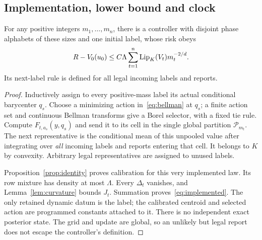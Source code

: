 \subsection{Implementation, lower bound and clock}
\begin{lemma}\label{lem:implementation}
For any positive integers $m_1,\ldots,m_n$, there is a controller with disjoint phase alphabets of these sizes and one initial label, whose risk obeys
\begin{equation}\label{eq:implemented}
 R-V_0(u_0)\le C\Lambda\sum_{t=1}^n\operatorname{Lip}_K(V_t)m_t^{-2/d}.
\end{equation}
Its next-label rule is defined for all legal incoming labels and reports.
\end{lemma}
\begin{proof}
Inductively assign to every positive-mass label its actual conditional barycenter $q_s$. Choose a minimizing action in~\eqref{eq:bellman} at $q_s$; a finite action set and continuous Bellman transforms give a Borel selector, with a fixed tie rule. Compute $F_{t,a_s}(y,q_s)$ and send it to its cell in the single global partition $\mathcal P_{m_t}$. The next representative is the conditional mean of this unpooled value after integrating over \emph{all} incoming labels and reports entering that cell. It belongs to $K$ by convexity. Arbitrary legal representatives are assigned to unused labels.

Proposition~\ref{prop:identity} proves calibration for this very implemented law. Its row mixture has density at most $\Lambda$. Every $\Delta_t$ vanishes, and Lemma~\ref{lem:curvature} bounds $J_t$. Summation proves~\eqref{eq:implemented}. The only retained dynamic datum is the label; the calibrated centroid and selected action are programmed constants attached to it. There is no independent exact posterior state. The grid and update are global, so an unlikely but legal report does not escape the controller's definition.
\end{proof}

